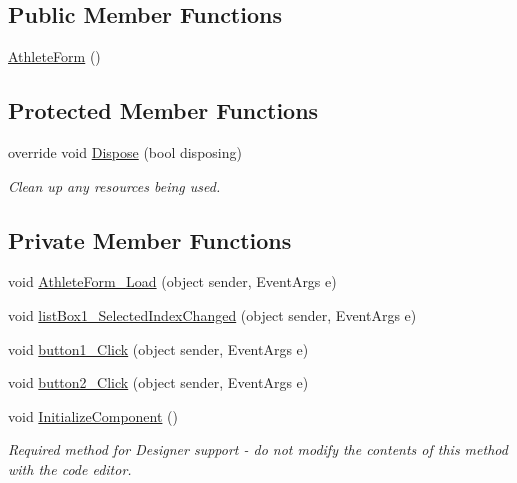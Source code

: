 \subsection*{Public Member Functions}
\begin{DoxyCompactItemize}
\item 
\hyperlink{classPCO_1_1AthleteForm_ac7c2d0e5ed03bbd98d1b5bd9a9245447}{Athlete\+Form} ()
\end{DoxyCompactItemize}
\subsection*{Protected Member Functions}
\begin{DoxyCompactItemize}
\item 
override void \hyperlink{classPCO_1_1AthleteForm_a33d12c8c052029a244dd49010486c093}{Dispose} (bool disposing)
\begin{DoxyCompactList}\small\item\em Clean up any resources being used. \end{DoxyCompactList}\end{DoxyCompactItemize}
\subsection*{Private Member Functions}
\begin{DoxyCompactItemize}
\item 
void \hyperlink{classPCO_1_1AthleteForm_a085dc790d2f36681997fa915c475148c}{Athlete\+Form\+\_\+\+Load} (object sender, Event\+Args e)
\item 
void \hyperlink{classPCO_1_1AthleteForm_a3d251648dacd89a7e2c5fffd83e1b08b}{list\+Box1\+\_\+\+Selected\+Index\+Changed} (object sender, Event\+Args e)
\item 
void \hyperlink{classPCO_1_1AthleteForm_ace79a726d8571af0a894611a5996ceef}{button1\+\_\+\+Click} (object sender, Event\+Args e)
\item 
void \hyperlink{classPCO_1_1AthleteForm_abdad683461eb55c7882c2b67693f3d51}{button2\+\_\+\+Click} (object sender, Event\+Args e)
\item 
void \hyperlink{classPCO_1_1AthleteForm_a8d21033e36a776e7288a6fbb9be22d53}{Initialize\+Component} ()
\begin{DoxyCompactList}\small\item\em Required method for Designer support -\/ do not modify the contents of this method with the code editor. \end{DoxyCompactList}\end{DoxyCompactItemize}
